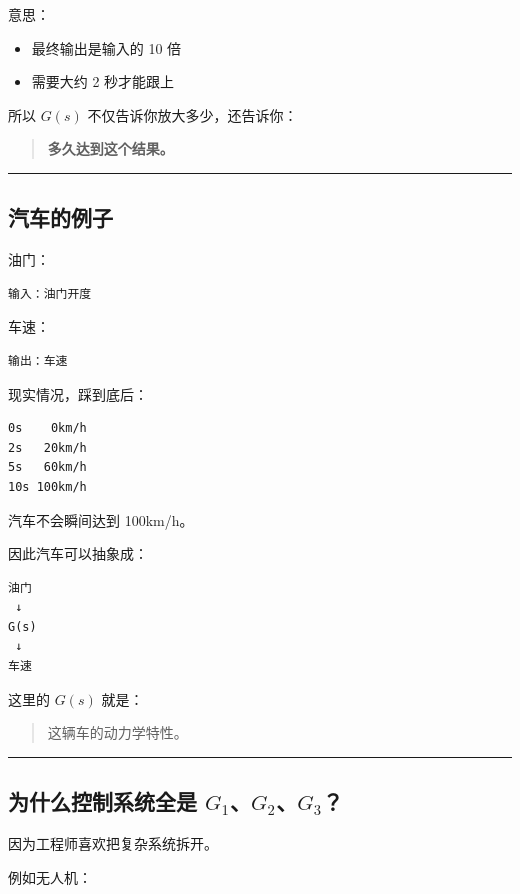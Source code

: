 \documentclass[UTF8,a4paper,11pt]{ctexart}
\begin{document}
意思：

\begin{itemize}
  \item 最终输出是输入的 10 倍
  \item 需要大约 2 秒才能跟上
\end{itemize}

所以 $G(s)$ 不仅告诉你放大多少，还告诉你：

\begin{quote}
\textbf{多久达到这个结果。}
\end{quote}

\bigskip\noindent\rule{\linewidth}{0.4pt}\bigskip

\subsection{汽车的例子}

油门：

\begin{verbatim}
输入：油门开度
\end{verbatim}

车速：

\begin{verbatim}
输出：车速
\end{verbatim}

现实情况，踩到底后：

\begin{verbatim}
0s    0km/h
2s   20km/h
5s   60km/h
10s 100km/h
\end{verbatim}

汽车不会瞬间达到 100km/h。

因此汽车可以抽象成：

\begin{verbatim}
油门
 ↓
G(s)
 ↓
车速
\end{verbatim}

这里的 $G(s)$ 就是：

\begin{quote}
这辆车的动力学特性。
\end{quote}

\bigskip\noindent\rule{\linewidth}{0.4pt}\bigskip

\subsection{为什么控制系统全是 $G_1$、$G_2$、$G_3$？}

因为工程师喜欢把复杂系统拆开。

例如无人机：
\end{document}
